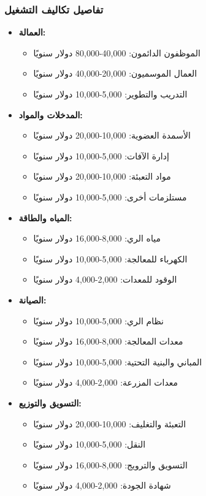 \subsubsection{تفاصيل تكاليف التشغيل}
\begin{itemize}
    \item \textbf{العمالة:}
    \begin{itemize}
        \item الموظفون الدائمون: 40,000-80,000 دولار سنويًا
        \item العمال الموسميون: 20,000-40,000 دولار سنويًا
        \item التدريب والتطوير: 5,000-10,000 دولار سنويًا
    \end{itemize}
    
    \item \textbf{المدخلات والمواد:}
    \begin{itemize}
        \item الأسمدة العضوية: 10,000-20,000 دولار سنويًا
        \item إدارة الآفات: 5,000-10,000 دولار سنويًا
        \item مواد التعبئة: 10,000-20,000 دولار سنويًا
        \item مستلزمات أخرى: 5,000-10,000 دولار سنويًا
    \end{itemize}
    
    \item \textbf{المياه والطاقة:}
    \begin{itemize}
        \item مياه الري: 8,000-16,000 دولار سنويًا
        \item الكهرباء للمعالجة: 5,000-10,000 دولار سنويًا
        \item الوقود للمعدات: 2,000-4,000 دولار سنويًا
    \end{itemize}
    
    \item \textbf{الصيانة:}
    \begin{itemize}
        \item نظام الري: 5,000-10,000 دولار سنويًا
        \item معدات المعالجة: 8,000-16,000 دولار سنويًا
        \item المباني والبنية التحتية: 5,000-10,000 دولار سنويًا
        \item معدات المزرعة: 2,000-4,000 دولار سنويًا
    \end{itemize}
    
    \item \textbf{التسويق والتوزيع:}
    \begin{itemize}
        \item التعبئة والتغليف: 10,000-20,000 دولار سنويًا
        \item النقل: 5,000-10,000 دولار سنويًا
        \item التسويق والترويج: 8,000-16,000 دولار سنويًا
        \item شهادة الجودة: 2,000-4,000 دولار سنويًا
    \end{itemize}
\end{itemize}

